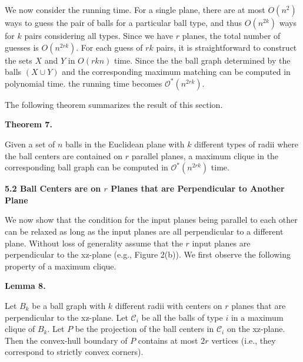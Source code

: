 \documentclass[10pt,a4paper]{amsart}
\begin{document}
\par
We now consider the running time. For a single plane, there are at most $O(n^{2})$ ways to guess the pair of balls for a particular ball type, and thus $O(n^{2k})$ ways for $k$ pairs considering all types. Since we have $r$ planes, the total number of guesses is $O(n^{2rk})$. For each guess of $rk$ pairs, it is straightforward to construct the sets $X$ and $Y$ in $O(rkn)$ time. Since the the ball graph determined by the balls $(X\cup Y)$ and the corresponding maximum matching can be computed in polynomial time. the running time becomes $\mathcal{O}^{*}(n^{2rk})$.
\par
\par
The following theorem summarizes the result of this section.
\par
\par
\par\medskip\noindent\textbf{Theorem 7.}\par
Given a set of $n$ balls in the Euclidean plane with $k$ different types of radii where the ball centers are contained on $r$ parallel planes, a maximum clique in the corresponding ball graph can be computed in $\mathcal{O}^{*}(n^{2rk})$ time.
\par
\par
\par
\par
\par
\par\medskip\noindent\textbf{5.2 Ball Centers are on $r$ Planes that are Perpendicular to Another Plane}\par
We now show that the condition for the input planes being parallel to each other can be relaxed as long as the input planes are all perpendicular to a different plane. Without loss of generality assume that the $r$ input planes are perpendicular to the xz-plane (e.g., Figure 2(b)). We first observe the following property of a maximum clique.
\par
\par
\par\medskip\noindent\textbf{Lemma 8.}\par
Let $B_{k}$ be a ball graph with $k$ different radii with centers on $r$ planes that are perpendicular to the xz-plane. Let $\mathcal{C}_{i}$ be all the balls of type $i$ in a maximum clique of $B_{k}$. Let $P$ be the projection of the ball centers in $\mathcal{C}_{i}$ on the xz-plane. Then the convex-hull boundary of $P$ contains at most $2r$ vertices (i.e., they correspond to strictly convex corners).
\end{document}
